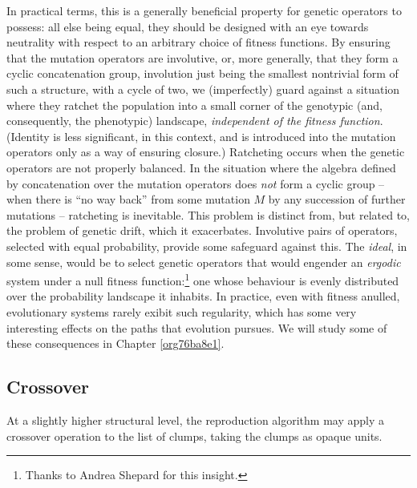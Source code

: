 \documentclass[12pt,glossary]{dalthesis}
\begin{document}
In practical terms, this is a generally beneficial property for genetic
operators to possess: all else being equal, they should be designed with
an eye towards neutrality with respect to an arbitrary choice of fitness
functions. By ensuring that the mutation operators are involutive, or, more
generally, that they form a cyclic concatenation group, involution just being
the smallest nontrivial form of such a structure, with a cycle of two, we
(imperfectly) guard against a situation where they ratchet the population into a
small corner of the genotypic (and, consequently, the phenotypic) landscape,
\emph{independent of the fitness function}. (Identity is less significant, in this
context, and is introduced into the mutation operators only
as a way of ensuring closure.) Ratcheting occurs when the genetic
operators are not properly balanced. In the situation where the algebra defined
by concatenation over the mutation operators does \emph{not} form a cyclic group --
when there is ``no way back'' from some mutation \(M\) by any succession of further
mutations -- ratcheting is inevitable. This problem is distinct from, but
related to, the problem of genetic drift, which it exacerbates. Involutive pairs
of operators, selected with equal probability, provide some safeguard against
this. The \emph{ideal}, in some sense, would be to select genetic operators that
would engender an \emph{ergodic} system under a null fitness function:\footnote{Thanks to
Andrea Shepard for this insight.} one whose behaviour is evenly distributed
over the probability landscape it inhabits. In practice, even with fitness
anulled, evolutionary systems rarely exibit such regularity, which has some very
interesting effects on the paths that evolution pursues. We will study some of
these consequences in Chapter \ref{org76ba8e1}.


\subsection{Crossover}
\label{sec:org3fcb972}
\label{orgb33b1c5} 

At a slightly higher structural level, the reproduction
algorithm may apply a crossover operation to the list of clumps, taking the
clumps as opaque units.
\end{document}
